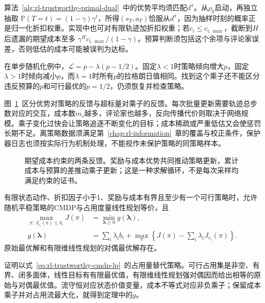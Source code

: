 算法~\ref{alg:rl-trustworthy-primal-dual}~中的优势平均须匹配$d^\pi$。从$\rho_0$启动，再独立抽取
$\mathbb P(T=t)=(1-\gamma)\gamma^t$，所得$(s_T,a_T)$恰服从$d^\pi$，因为抽样时刻的概率正是归一化折扣权重。实现中也可对有限轨迹加折扣权重；若$c_i\leq c_{i,\max}$，截断到$H$后遗漏的期望成本至多
$\gamma^Hc_{i,\max}/(1-\gamma)$。预算判断须包括这个余项与评论家误差，否则低估的成本可能被误判为达标。

在单步随机化例中，$\mathcal L=p-\lambda(p-1/2)$。固定$\lambda<1$时策略倾向增大$p$，固定$\lambda>1$时倾向减小$p$，而$\lambda=1$时所有$p$的拉格朗日值相同。找到这个乘子还不能区分违反预算的$p$和可行最优的$p=1/2$，仍须恢复并检查策略。

图~\ref{fig:rl-trustworthy-primal-dual}~区分优势对策略的反馈与超标量对乘子的反馈。每次批量更新需要轨迹总步数对应的交互，成本数$m_c$越多，评论家也越多，反向传播代价则取决于网络规模。乘子变化过快会让策略追逐不断变化的目标；成本稀疏或严重低估又会使惩罚长期不足。离策略数据须满足第~\ref{chap:rl-information}~章的覆盖与校正条件，保护器日志也须按实际行为机制处理，不能视作未保护策略的同策略样本。

\begin{figure}[htbp]
  \centering
  
  \caption{期望成本约束的两条反馈。奖励与成本优势共同推动策略更新，累计成本与预算的差推动乘子更新；这是一种求解循环，不是每次采样均满足约束的证书。}
  \label{fig:rl-trustworthy-primal-dual}
\end{figure}

\begin{theorem}[有限折扣CMDP的强对偶]
  \label{thm:rl-trustworthy-strong-duality}
  有限状态动作、折扣因子小于1、奖励与成本有界且至少有一个可行策略时，允许随机平稳策略的CMDP与占用度量线性规划等价，且
  \[
    \begin{aligned}
      \max_{\pi:\,J_{c_i}(\pi)\leq b_i}J(\pi)
        &=\min_{\bm{\lambda}\geq0}g(\bm{\lambda}),\\
      g(\bm{\lambda})
        &=\sum_i\lambda_i b_i+
          \max_\pi\left\{J(\pi)-\sum_i\lambda_iJ_{c_i}(\pi)\right\}.
    \end{aligned}
  \]
  原始最优解和有限维线性规划的对偶最优解存在。
\end{theorem}

证明以式~\eqref{eq:rl-trustworthy-cmdp-lp}~的占用量替代策略。可行占用集是非空、有界、闭多面体，线性目标有有限最优值，有限维线性规划强对偶因而给出相等的原始与对偶最优值。流守恒对应状态价值变量，成本不等式对应非负乘子；保留成本乘子并对占用流最大化，就得到定理中的$g$。

